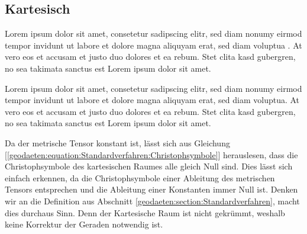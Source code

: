 %
%
%
%
\subsection{Kartesisch\label{geodaeten:section:StaKartesisch}}

Lorem ipsum dolor sit amet, consetetur sadipscing elitr, sed diam
nonumy eirmod tempor invidunt ut labore et dolore magna aliquyam
erat, sed diam voluptua \cite{geodaeten:bibtex}.
At vero eos et accusam et justo duo dolores et ea rebum.
Stet clita kasd gubergren, no sea takimata sanctus est Lorem ipsum
dolor sit amet.

Lorem ipsum dolor sit amet, consetetur sadipscing elitr, sed diam
nonumy eirmod tempor invidunt ut labore et dolore magna aliquyam
erat, sed diam voluptua.
At vero eos et accusam et justo duo dolores et ea rebum.  Stet clita
kasd gubergren, no sea takimata sanctus est Lorem ipsum dolor sit
amet.

Da der metrische Tensor konstant ist, lässt sich aus Gleichung [\ref{geodaeten:equation:Standardverfahren:Christophsymbole}] herauslesen, dass die Christophsymbole des kartesischen Raumes alle gleich Null sind.
Dies lässt sich einfach erkennen, da die Christophsymbole einer Ableitung des metrischen Tensors entsprechen und die Ableitung einer Konstanten immer Null ist.
Denken wir an die Definition aus Abschnitt \ref{geodaeten:section:Standardverfahren}, macht dies durchaus Sinn.
Denn der Kartesische Raum ist nicht gekrümmt, weshalb keine Korrektur der Geraden notwendig ist.

